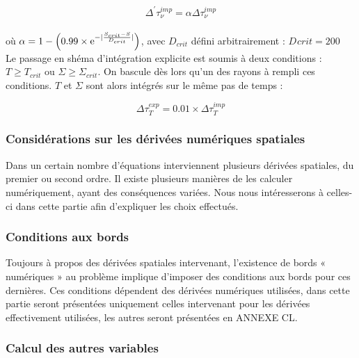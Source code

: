 \begin{equation}
	\Delta^{'} \tau_{\nu}^{imp} = \alpha \Delta \tau_{\nu}^{imp}
\end{equation} \\

où $\alpha = 1 - \left( 0.99 \times \e^{- \lvert \frac{S_{crit} - S}{D_{crit}} \rvert} \right)$, avec $D_{crit}$ défini arbitrairement : $D_{}crit = 200$ \\

Le passage en shéma d'intégration explicite est soumis à deux conditions : $T \ge T_{crit}$ ou $\Sigma \ge \Sigma_{crit}$. On bascule dès lors qu'un des rayons à rempli ces conditions. $T$ et $\Sigma$ sont alors intégrés sur le même pas de temps :

\begin{equation}
\Delta \tau_{T}^{exp} = 0.01 \times \Delta \tau_{T}^{imp}
\end{equation}

\subsubsection{Considérations sur les dérivées numériques spatiales}

Dans un certain nombre d’équations interviennent plusieurs dérivées spatiales,
du premier ou second ordre. Il existe plusieurs manières de les calculer
numériquement, ayant des conséquences variées. Nous nous intéresserons à
celles-ci dans cette partie afin d’expliquer les choix effectués.

\subsubsection{Conditions aux bords}

Toujours à propos des dérivées spatiales intervenant, l’existence de bords «
numériques » au problème implique d’imposer des conditions aux bords pour ces
dernières. Ces conditions dépendent des dérivées numériques utilisées, dans
cette partie seront présentées uniquement celles intervenant pour les dérivées
effectivement utilisées, les autres seront présentées en ANNEXE CL.

\subsubsection{Calcul des autres variables}


%

